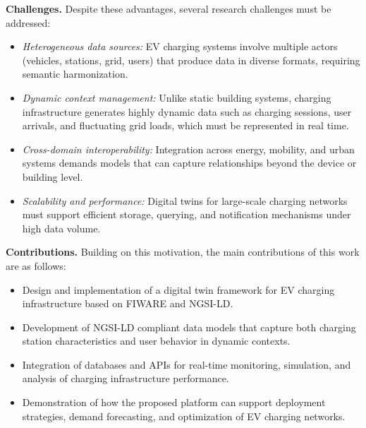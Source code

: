 \textbf{Challenges.} Despite these advantages, several research
challenges must be addressed:
\begin{itemize}
  \item \emph{Heterogeneous data sources:} EV charging systems involve
  multiple actors (vehicles, stations, grid, users) that produce data in
  diverse formats, requiring semantic harmonization.
  \item \emph{Dynamic context management:} Unlike static building
  systems, charging infrastructure generates highly dynamic data such
  as charging sessions, user arrivals, and fluctuating grid loads, which
  must be represented in real time.
  \item \emph{Cross-domain interoperability:} Integration across energy,
  mobility, and urban systems demands models that can capture
  relationships beyond the device or building level.
  \item \emph{Scalability and performance:} Digital twins for large-scale
  charging networks must support efficient storage, querying, and
  notification mechanisms under high data volume.
\end{itemize}

\textbf{Contributions.} Building on this motivation, the main
contributions of this work are as follows:
\begin{itemize}
  \item Design and implementation of a digital twin framework for EV
  charging infrastructure based on FIWARE and NGSI-LD.
  \item Development of NGSI-LD compliant data models that capture
  both charging station characteristics and user behavior in dynamic
  contexts.
  \item Integration of databases and APIs for real-time monitoring,
  simulation, and analysis of charging infrastructure performance.
  \item Demonstration of how the proposed platform can support
  deployment strategies, demand forecasting, and optimization of EV
  charging networks.
\end{itemize}






